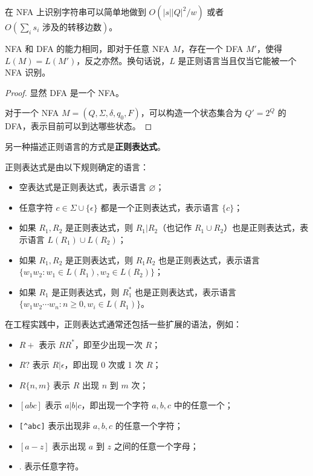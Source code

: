 在 NFA 上识别字符串可以简单地做到 $O(|s||Q|^2/w)$ 或者 $O(\sum_i s_i\text{ 涉及的转移边数})$。

\begin{theorem}
    NFA 和 DFA 的能力相同，即对于任意 NFA $M$，存在一个 DFA $M'$，使得 $L(M)=L(M')$，反之亦然。换句话说，$L$ 是正则语言当且仅当它能被一个 NFA 识别。
\end{theorem}
\begin{proof}
    显然 DFA 是一个 NFA。

    对于一个 NFA $M=(Q,\Sigma,\delta,q_0,F)$，可以构造一个状态集合为 $Q'=2^Q$ 的 DFA，表示目前可以到达哪些状态。
\end{proof}

另一种描述正则语言的方式是\textbf{正则表达式}。
\begin{definition}[正则表达式]
    正则表达式是由以下规则确定的语言：
    \begin{itemize}
        \item 空表达式是正则表达式，表示语言 $\varnothing$；
        \item 任意字符 $c\in \Sigma\cup \{\epsilon\}$ 都是一个正则表达式，表示语言 $\{c\}$；
        \item 如果 $R_1,R_2$ 是正则表达式，则 $R_1|R_2$（也记作 $R_1\cup R_2$）也是正则表达式，表示语言 $L(R_1)\cup L(R_2)$；
        \item 如果 $R_1,R_2$ 是正则表达式，则 $R_1R_2$ 也是正则表达式，表示语言 $\{w_1w_2 : w_1\in L(R_1), w_2\in L(R_2)\}$；
        \item 如果 $R_1$ 是正则表达式，则 $R_1^*$ 也是正则表达式，表示语言 $\{w_1w_2\cdots w_n : n\ge 0, w_i\in L(R_1)\}$。
    \end{itemize}
\end{definition}
\begin{remark}
    在工程实践中，正则表达式通常还包括一些扩展的语法，例如：
    \begin{itemize}
        \item $R+$ 表示 $RR^*$，即至少出现一次 $R$；
        \item $R?$ 表示 $R|\epsilon$，即出现 0 次或 1 次 $R$；
        \item $R\{n,m\}$ 表示 $R$ 出现 $n$ 到 $m$ 次；
        \item $[abc]$ 表示 $a|b|c$，即出现一个字符 $a,b,c$ 中的任意一个；
        \item \verb|[^abc]| 表示出现非 $a,b,c$ 的任意一个字符；
        \item $[a-z]$ 表示出现 $a$ 到 $z$ 之间的任意一个字母；
        \item $.$ 表示任意字符。
    \end{itemize}
\end{remark}
